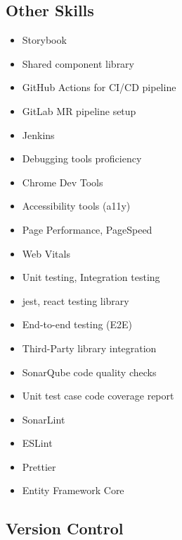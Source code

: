 \documentclass[letterpaper]{deedy-resume} %
\begin{document}
\begin{minipage}[t]{0.33\textwidth}

\vspace{-\topsep}


\subsection{Other Skills}

\begin{itemize}
\setlength\itemsep{-0.5em} %
\item Storybook
\item Shared component library
\item GitHub Actions for CI/CD pipeline
\item GitLab MR pipeline setup
\item Jenkins
\item Debugging tools proficiency
\item Chrome Dev Tools
\item Accessibility tools (a11y)
\item Page Performance, PageSpeed
\item Web Vitals
\item Unit testing, Integration testing
\item jest, react testing library
\item End-to-end testing (E2E)
\item Third-Party library integration
\item SonarQube code quality checks
\item Unit test case code coverage report
\item SonarLint
\item ESLint
\item Prettier
\item Entity Framework Core
\end{itemize}


\vspace{-\topsep}


\subsection{Version Control}


\end{minipage}
\end{document}
